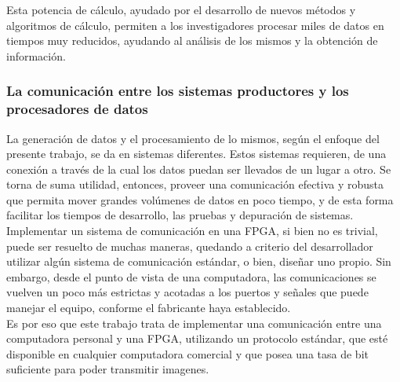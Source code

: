 Esta potencia de cálculo, ayudado por el desarrollo de nuevos métodos y algoritmos de cálculo, permiten a los investigadores procesar miles de datos en tiempos muy reducidos, ayudando al análisis de los mismos y la obtención de información.\\

\subsubsection*{La comunicación entre los sistemas productores y los procesadores de datos}
La generación de datos y el procesamiento de lo mismos, según el enfoque del presente trabajo, se da en sistemas diferentes. Estos sistemas requieren, de una conexión a través de la cual los datos puedan ser llevados de un lugar a otro. Se torna de suma utilidad, entonces, proveer una comunicación efectiva y robusta que permita mover grandes volúmenes de datos en poco tiempo, y de esta forma facilitar los tiempos de desarrollo, las pruebas y depuración de sistemas.\\

Implementar un sistema de comunicación en una FPGA, si bien no es trivial, puede ser resuelto de muchas maneras, quedando a criterio del desarrollador utilizar algún sistema de comunicación estándar, o bien, diseñar uno propio. Sin embargo, desde el punto de vista de una computadora, las comunicaciones se vuelven un poco más estrictas y acotadas a los puertos y señales que puede manejar el equipo, conforme el fabricante haya establecido.\\

Es por eso que este trabajo trata de implementar una comunicación entre una computadora personal y una FPGA, utilizando un protocolo estándar, que esté disponible en cualquier computadora comercial y que posea una tasa de bit suficiente para poder transmitir imagenes.\\



